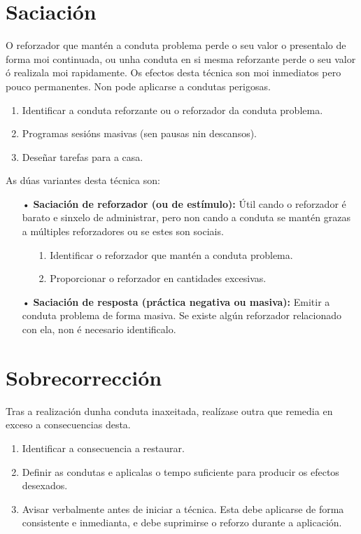\documentclass[a4paper,11pt]{article}
\begin{document}
\section{Saciación}
O reforzador que mantén a conduta problema perde o seu valor o presentalo de forma moi continuada, ou unha conduta en si mesma reforzante perde o seu valor ó realizala moi rapidamente. Os efectos desta técnica son moi inmediatos pero pouco permanentes. Non pode aplicarse a condutas perigosas.
\begin{enumerate}
	\item Identificar a conduta reforzante ou o reforzador da conduta problema.
	\item Programas sesións masivas (sen pausas nin descansos).
	\item Deseñar tarefas para a casa.
\end{enumerate}

As dúas variantes desta técnica son:
\begin{itemize}
	\item[•] \textbf{Saciación de reforzador (ou de estímulo):} Útil cando o reforzador é barato e 
	sinxelo de administrar, pero non cando a conduta se mantén grazas a múltiples reforzadores ou 
	se estes son sociais.
	\begin{itemize}
		\item[1.] Identificar o reforzador que mantén a conduta problema.
		\item[2.] Proporcionar o reforzador en cantidades excesivas.
	\end{itemize}
	\item[•] \textbf{Saciación de resposta (práctica negativa ou masiva):} Emitir a conduta problema 
	de forma masiva. Se existe algún reforzador relacionado con ela, non é necesario identificalo.
\end{itemize}

\section{Sobrecorrección}
Tras a realización dunha conduta inaxeitada, realízase outra que remedia en exceso a consecuencias desta.
\begin{enumerate}
	\item Identificar a consecuencia a restaurar. 
	\item Definir as condutas e aplicalas o tempo suficiente para producir os efectos desexados.
	\item Avisar verbalmente antes de iniciar a técnica. Esta debe aplicarse de forma consistente e 
	inmedianta, e debe suprimirse o reforzo durante a aplicación.
\end{enumerate}
\end{document}
